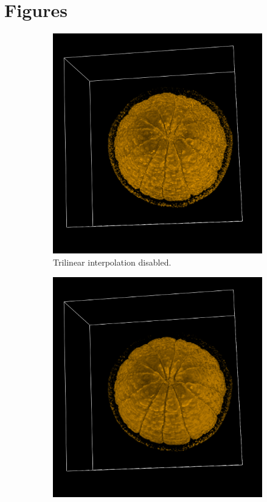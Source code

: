 \documentclass[a4paper]{article}
\begin{document}
\pagebreak
\appendix
\section{Figures}

\begin{figure}[h]
  \centering
  \begin{subfigure}[b]{0.45\textwidth}
    \centering
    \includegraphics[width=\textwidth]{trilinear-off}
    \caption{Trilinear interpolation disabled.}
  \end{subfigure}
  \hfill
  \begin{subfigure}[b]{0.45\textwidth}
    \centering
    \includegraphics[width=\textwidth]{trilinear-on}

\end{subfigure}
\end{figure}
\end{document}
